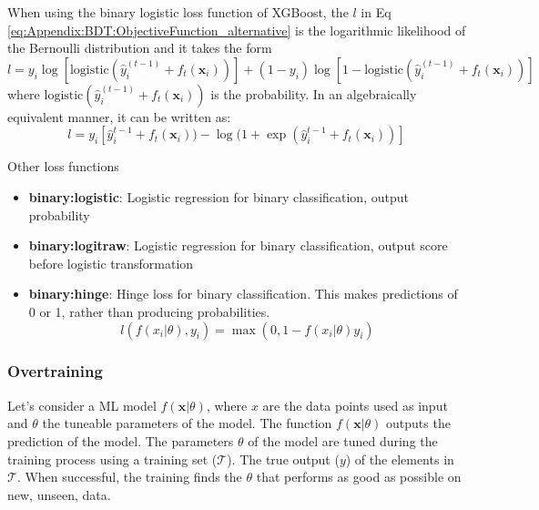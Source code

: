 When using the binary logistic loss function of XGBoost, the
$l$ in Eq \ref{eq:Appendix:BDT:ObjectiveFunction_alternative} 
is the logarithmic likelihood of the Bernoulli distribution and it %
takes the form
\begin{equation}
\label{eq:Appendix:BDT:binaryLogistic_A}
	l = y_i \log[\text{logistic}(\hat{y}_i^{(t-1)} + f_t(\bm{x}_i))] + (1-y_i)\log[1-\text{logistic}(\hat{y}_i^{(t-1)} + f_t(\bm{x}_i))] \,
\end{equation}
where $\text{logistic}(\hat{y}_i^{(t-1)} + f_t(\bm{x}_i))$ is the probability.  In an algebraically equivalent
manner, it can be written as:
\begin{equation}
\label{eq:Appendix:BDT:binaryLogistic_B}
	l = y_i [\hat{y}_i^{t-1} + f_t(\bm{x}_i)) - \log(1 + \exp (\hat{y}_i^{t-1} + f_t(\bm{x}_i))]
\end{equation}


Other loss functions
\begin{itemize}
	\item \textbf{binary:logistic}: Logistic regression for binary classification, output probability
	\item \textbf{binary:logitraw}: Logistic regression for binary classification, output score before logistic transformation
	\item \textbf{binary:hinge}: Hinge loss for binary classification. This makes predictions of 0 or 1, rather than producing probabilities.
	\begin{equation}
		l(f(x_i|\theta), y_i) = \max(0, 1-f(x_i|\theta)y_i)
	\end{equation} %
	
\end{itemize}


\subsubsection{Overtraining}
\label{chap:Appendix:BDT:Overtraining} 

Let's consider a ML model $f(\bm{x}|\theta)$, where $x$ are the data points used as input and $\theta$
the tuneable parameters of the model. The function $f(\bm{x}|\theta)$ outputs the prediction of the model.
The parameters $\theta$ of the model are tuned during the training process using a training set 
($\mathcal{T}$). The true output ($y$) of the elements in $\mathcal{T}$.
When successful, the training finds the $\theta$ that performs as good as possible on new, 
unseen, data.

